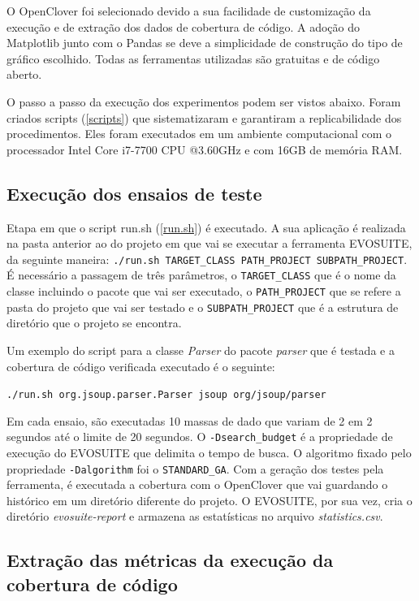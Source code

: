 O OpenClover foi selecionado devido a sua facilidade de customização da execução e de extração dos dados de cobertura de código. A adoção do Matplotlib junto com o Pandas se deve a simplicidade de construção do tipo de gráfico escolhido. Todas as ferramentas utilizadas são gratuitas e de código aberto.

O passo a passo da execução dos experimentos podem ser vistos abaixo. Foram criados scripts (\ref{scripts}) que sistematizaram e garantiram a replicabilidade dos procedimentos. Eles foram executados em um ambiente computacional com o processador Intel Core i7-7700 CPU @3.60GHz e com 16GB de memória RAM.

\subsection{Execução dos ensaios de teste}

Etapa em que o script run.sh (\ref{run.sh}) é executado. A sua aplicação é realizada na pasta anterior ao do projeto em que vai se executar a ferramenta EVOSUITE, da seguinte maneira: \texttt{./run.sh TARGET_CLASS PATH_PROJECT SUBPATH_PROJECT}. É necessário a passagem de três parâmetros, o \texttt{TARGET_CLASS} que é o nome da classe incluindo o pacote que vai ser executado, o \texttt{PATH_PROJECT} que se refere a pasta do projeto que vai ser testado e o \texttt{SUBPATH_PROJECT} que é a estrutura de diretório que o projeto se encontra. 

Um exemplo do script para a classe \textit{Parser} do pacote \textit{parser} que é testada e a cobertura de código verificada executado é o seguinte: 

\texttt{./run.sh org.jsoup.parser.Parser jsoup org/jsoup/parser}

Em cada ensaio, são executadas 10 massas de dado que variam de 2 em 2 segundos até o limite de 20 segundos. O \texttt{-Dsearch_budget} é a propriedade de execução do EVOSUITE que delimita o tempo de busca. O algoritmo fixado pelo propriedade \texttt{-Dalgorithm} foi o \texttt{STANDARD_GA}. Com a geração dos testes pela ferramenta, é executada a cobertura com o OpenClover que vai guardando o histórico em um diretório diferente do projeto. O EVOSUITE, por sua vez, cria o diretório \textit{evosuite-report} e armazena as estatísticas no arquivo \textit{statistics.csv}.

\subsection{Extração das métricas da execução da cobertura de código}

